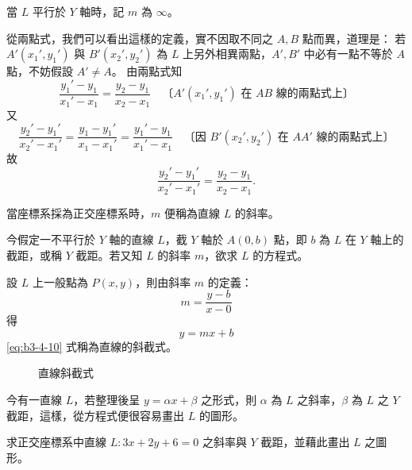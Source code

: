 當 $L$ 平行於 $Y$ 軸時，記 $m$ 為 $\infty$。

從兩點式，我們可以看出這樣的定義，實不因取不同之 $A, B$ 點而異，道理是：
若 $A'(x_1', y_1')$ 與 $B'(x_2', y_2')$ 為 $L$ 上另外相異兩點，$A', B'$ 中必有一點不等於 $A$ 點，不妨假設 $A' \neq A$。
由兩點式知
\[ \frac{y_1' - y_1}{x_1' - x_1} = \frac{y_2 - y_1}{x_2 - x_1} \quad\text{〔$A'(x_1', y_1')$ 在 $AB$ 線的兩點式上〕} \]
又
\[ \frac{y_2' - y_1'}{x_2' - x_1'} = \frac{y_1 - y_1'}{x_1 - x_1'} = \frac{y_1' - y_1}{x_1' - x_1} \quad\text{〔因 $B'(x_2', y_2')$ 在 $AA'$ 線的兩點式上〕} \]
故
\[ \frac{y_2' - y_1'}{x_2' - x_1'} = \frac{y_2 - y_1}{x_2 - x_1}. \]

當座標系採為正交座標系時，$m$ 便稱為直線 $L$ 的斜率。

今假定一不平行於 $Y$ 軸的直線 $L$，截 $Y$ 軸於 $A(0, b)$ 點，即 $b$ 為 $L$ 在 $Y$ 軸上的截距，或稱 $Y$ 截距。若又知 $L$ 的斜率 $m$，欲求 $L$ 的方程式。

設 $L$ 上一般點為 $P(x, y)$，則由斜率 $m$ 的定義：
\[ m = \frac{y - b}{x - 0} \]
得
\begin{equation}
y = mx + b
\label{eq:b3-4-10}
\end{equation}
\eqref{eq:b3-4-10} 式稱為直線的斜截式。

\begin{figure}[H]
\centering
{}
\caption{直線斜截式}
\label{fig:4-17}
\end{figure}

今有一直線 $L$，若整理後呈 $y = \alpha x + \beta$ 之形式，則 $\alpha$ 為 $L$ 之斜率，$\beta$ 為 $L$ 之 $Y$ 截距，這樣，從方程式便很容易畫出 $L$ 的圖形。

\begin{example}[例 10]
求正交座標系中直線 $L : 3x + 2y + 6 = 0$ 之斜率與 $Y$ 截距，並藉此畫出 $L$ 之圖形。
\end{example}

